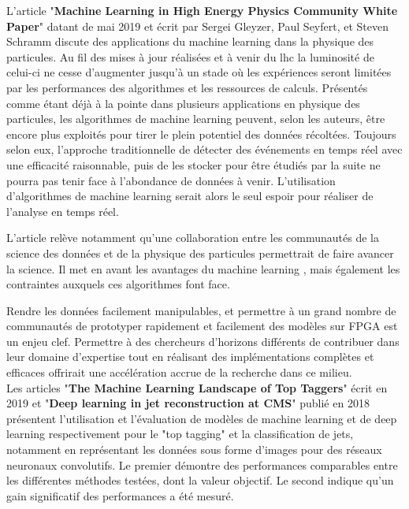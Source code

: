 L'article "\textbf{Machine Learning in High Energy Physics Community White Paper}" \cite{albertsson_machine_2019} datant de mai 2019 et écrit par Sergei Gleyzer, Paul Seyfert, et Steven Schramm discute des applications du machine learning dans la physique des particules. Au fil des mises à jour réalisées et à venir du \acrshort{lhc} la luminosité de celui-ci ne cesse d'augmenter jusqu'à un stade où les expériences seront limitées par les performances des algorithmes et les ressources de calculs. Présentés comme étant déjà à la pointe dans plusieurs applications en physique des particules, les algorithmes de machine learning peuvent, selon les auteurs, être encore plus exploités pour tirer le plein potentiel des données récoltées. Toujours selon eux, l'approche traditionnelle de détecter des événements en temps réel avec une efficacité raisonnable, puis de les stocker pour être étudiés par la suite ne pourra pas tenir face à l'abondance de données à venir. L'utilisation d'algorithmes de machine learning serait alors le seul espoir pour réaliser de l'analyse en temps réel.

L'article relève notamment qu'une collaboration entre les communautés de la science des données et de la physique des particules permettrait de faire avancer la science. Il met en avant les avantages du machine learning , mais également les contraintes auxquels ces algorithmes font face.

Rendre les données facilement manipulables, et permettre à un grand nombre de communautés de prototyper rapidement et facilement des modèles sur FPGA est un enjeu clef. Permettre à des chercheurs d'horizons différents de contribuer dans leur domaine d'expertise tout en réalisant des implémentations complètes et efficaces offrirait une accélération accrue de la recherche dans ce milieu.\\

Les articles "\textbf{The Machine Learning Landscape of Top Taggers}" \cite{kasieczka_machine_2019} écrit en 2019 et "\textbf{Deep learning in jet reconstruction at CMS}" \cite{stoye_deep_2018} publié en 2018 présentent l'utilisation et l'évaluation de modèles de machine learning et de deep learning respectivement pour le "top tagging" et la classification de jets, notamment en représentant les données sous forme d'images pour des réseaux neuronaux convolutifs. Le premier démontre des performances comparables entre les différentes méthodes testées, dont la valeur objectif. Le second indique qu'un gain significatif des performances a été mesuré.

